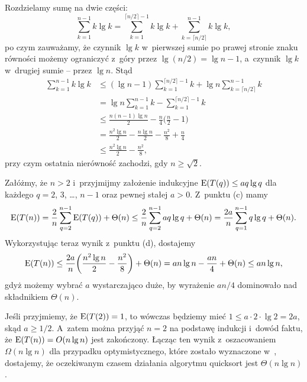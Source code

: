 \subproblem %
Rozdzielamy sumę na dwie części:
\[
	\sum_{k=1}^{n-1}k\lg k = \sum_{k=1}^{\lceil n/2\rceil-1}k\lg k+\sum_{k=\lceil n/2\rceil}^{n-1}k\lg k,
\]
po czym zauważamy, że czynnik $\lg k$ w~pierwszej sumie po prawej stronie znaku równości możemy ograniczyć z~góry przez $\lg(n/2)=\lg n-1$, a~czynnik $\lg k$ w~drugiej sumie -- przez $\lg n$.
Stąd
\begin{align*}
	\sum_{k=1}^{n-1}k\lg k &\le (\lg n-1)\sum_{k=1}^{\lceil n/2\rceil-1}k+\lg n\sum_{k=\lceil n/2\rceil}^{n-1}k \\
	&= \lg n\sum_{k=1}^{n-1}k-\sum_{k=1}^{\lceil n/2\rceil-1}k \\[2mm]
	&\le \frac{n(n-1)\lg n}{2}-\frac{n}{4}\biggl(\frac{n}{2}-1\biggr) \\
	&= \frac{n^2\lg n}{2}-\frac{n\lg n}{2}-\frac{n^2}{8}+\frac{n}{4} \\[1mm]
	&\le \frac{n^2\lg n}{2}-\frac{n^2}{8},
\end{align*}
przy czym ostatnia nierówność zachodzi, gdy $n\ge\sqrt{2}$.

\subproblem %
Załóżmy, że $n>2$ i~przyjmijmy założenie indukcyjne $\operatorname{E}(T(q))\le aq\lg q$ dla każdego $q=2$, 3, \dots, $n-1$ oraz pewnej stałej $a>0$.
Z~punktu (c) mamy
\[
	\operatorname{E}(T(n)) = \frac{2}{n}\sum_{q=2}^{n-1}\operatorname{E}(T(q))+\Theta(n) \le \frac{2}{n}\sum_{q=2}^{n-1}aq\lg q+\Theta(n) = \frac{2a}{n}\sum_{q=1}^{n-1}q\lg q+\Theta(n).
\]
Wykorzystując teraz wynik z~punktu (d), dostajemy
\[
	\operatorname{E}(T(n)) \le \frac{2a}{n}\biggl(\frac{n^2\lg n}{2}-\frac{n^2}{8}\biggr)+\Theta(n) = an\lg n-\frac{an}{4}+\Theta(n) \le an\lg n,
\]
gdyż możemy wybrać $a$ wystarczająco duże, by wyrażenie $an/4$ dominowało nad składnikiem $\Theta(n)$.

Jeśli przyjmiemy, że $\operatorname{E}(T(2))=1$, to wówczas będziemy mieć $1\le a\cdot2\cdot\lg2=2a$, skąd $a\ge1/2$.
A~zatem można przyjąć $n=2$ na podstawę indukcji i~dowód faktu, że $\operatorname{E}(T(n))=O(n\lg n)$ jest zakończony.
Łącząc ten wynik z~oszacowaniem $\Omega(n\lg n)$ dla przypadku optymistycznego, które zostało wyznaczone w~, dostajemy, że oczekiwanym czasem działania algorytmu quicksort jest $\Theta(n\lg n)$.
